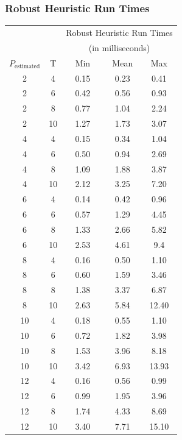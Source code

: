 \documentclass{beamer}
\begin{document}
\begin{frame}
\frametitle{Robust Heuristic Run Times}
\begin{table}\tiny
\centering
\begin{tabular}{cc|ccc}
  \hline
   & & \multicolumn{3}{c}{Robust Heuristic Run Times} \\
   & & \multicolumn{3}{c}{(in milliseconds)}\\
   $ P_{\text{estimated}}$ & T & $\;\;$Min$\;\;$ & Mean & Max \\ 
  \hline
  \hline
  2 & 4 & 0.15 & 0.23 & 0.41 \\ 
  2 & 6 & 0.42 & 0.56 & 0.93 \\ 
  2 & 8 & 0.77 & 1.04 & 2.24 \\ 
  2 & 10 & 1.27 & 1.73 & 3.07 \\ 
  4 & 4 & 0.15 & 0.34 & 1.04 \\ 
  4 & 6 & 0.50 & 0.94 & 2.69 \\ 
  4 & 8 & 1.09 & 1.88 & 3.87 \\ 
  4 & 10 & 2.12 & 3.25 & 7.20 \\ 
  6 & 4 & 0.14 & 0.42 & 0.96 \\ 
  6 & 6 & 0.57 & 1.29 & 4.45 \\ 
  6 & 8 & 1.33 & 2.66 & 5.82 \\ 
  6 & 10 & 2.53 & 4.61 & 9.4 \\ 
  8 & 4 & 0.16 & 0.50 & 1.10 \\ 
  8 & 6 & 0.60 & 1.59 & 3.46 \\ 
  8 & 8 & 1.38 & 3.37 & 6.87 \\ 
  8 & 10 & 2.63 & 5.84 & 12.40 \\ 
  10 & 4 & 0.18 & 0.55 & 1.10 \\ 
  10 & 6 & 0.72 & 1.82 & 3.98 \\ 
  10 & 8 & 1.53 & 3.96 & 8.18 \\ 
  10 & 10 & 3.42 & 6.93 & 13.93 \\ 
  12 & 4 & 0.16 & 0.56 & 0.99 \\ 
  12 & 6 & 0.99 & 1.95 & 3.96 \\ 
  12 & 8 & 1.74 & 4.33 & 8.69 \\ 
  12 & 10 & 3.40 & 7.71 & 15.10 \\ 
   \hline
\end{tabular}
\end{table}
\end{frame}
\end{document}
